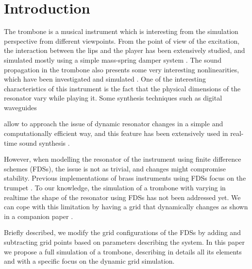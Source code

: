 \section{Introduction}\label{sec:introduction}

The trombone is a musical instrument which is interesting from the simulation perspective from different viewpoints.
From the point of view of the excitation, the interaction between the lips and the player has been extensively studied, and simulated mostly using a simple mass-spring damper system \cite{campbell2004brass}.
The sound propagation in the trombone also presents some very interesting nonlinearities, which have been investigated and simulated
\cite{msallam1997physical,msallam2000physical,campbell2004brass}.
One of the interesting characteristics of this instrument is the fact that the physical dimensions of the resonator vary while playing it.
Some synthesis techniques such as digital waveguides 

allow to approach the issue of dynamic resonator changes in a simple and computationally efficient way, and this feature has been extensively used in real-time sound synthesis \cite{cook2002real}.

However, when modelling the resonator of the instrument using finite difference schemes (FDSs), the issue is not as trivial, and changes might compromise stability.
Previous implementations of brass instruments using FDSs focus on the trumpet 
 \cite{harrison2015environment}. To our knowledge, the simulation of a trombone with varying in realtime the shape of the resonator using FDSs has not been addressed yet.
We can cope with this limitation  by having a grid that 
 dynamically changes as shown in a companion paper \cite{Willemsen2021}.

 

 Briefly described, we modify the grid configurations of the FDSs by adding and subtracting grid points based on parameters describing the system.
 In this paper we propose a full simulation of a trombone, describing in details all its elements and with a specific focus on the dynamic grid simulation.
 